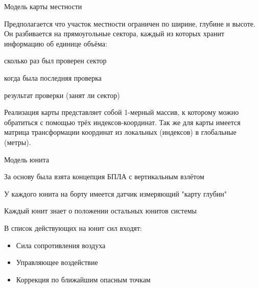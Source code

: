 \begin{docsec}{Модель карты местности}

    \item Предполагается что участок местности ограничен по ширине,
    глубине и высоте.
    Он разбивается на прямоугольные сектора, каждый из которых хранит
    информацию об единице объёма:

    \begin{mintemize}
    \item сколько раз был проверен сектор
    \item когда была последняя проверка
    \item результат проверки (занят ли сектор)
    \end{mintemize}

    \item Реализация карты представляет собой 1-мерный массив,
    к которому можно обратиться с помощью трёх индексов-координат.
    Так же для карты имеется матрица трансформации координат
    из локальных (индексов) в глобальные (метры).

\end{docsec}

\begin{docsec}{Модель юнита}
    \item За основу была взята концепция БПЛА с вертикальным взлётом
    \item У каждого юнита на борту имеется датчик измеряющий "карту глубин"
    \item Каждый юнит знает о положении остальных юнитов системы
    \item В список действующих на юнит сил входят:
        \begin{itemize}
            \item Сила сопротивления воздуха
            \item Управляющее воздействие
            \item Коррекция по ближайшим опасным точкам
        \end{itemize}
\end{docsec}

